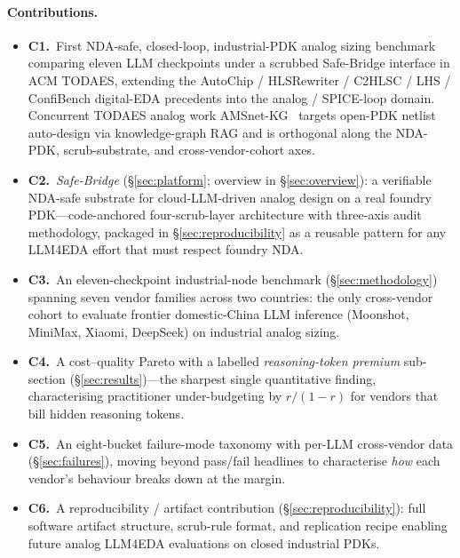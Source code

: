 \paragraph{Contributions.}
\begin{itemize}
  \item \textbf{C1.}~First NDA-safe, closed-loop, industrial-PDK
    analog sizing benchmark comparing eleven LLM checkpoints under
    a scrubbed Safe-Bridge interface in ACM TODAES, extending the
    AutoChip / HLSRewriter / C2HLSC / LHS / ConfiBench digital-EDA
    precedents into the analog / SPICE-loop domain. Concurrent
    TODAES analog work AMSnet-KG~\cite{amsnetkg} targets open-PDK
    netlist auto-design via knowledge-graph RAG and is orthogonal
    along the NDA-PDK, scrub-substrate, and cross-vendor-cohort
    axes.
  \item \textbf{C2.}~\emph{Safe-Bridge} (\S\ref{sec:platform};
    overview in \S\ref{sec:overview}): a verifiable NDA-safe
    substrate for cloud-LLM-driven analog design on a real foundry
    PDK---code-anchored four-scrub-layer architecture with
    three-axis audit methodology, packaged in
    \S\ref{sec:reproducibility} as a reusable pattern for any
    LLM4EDA effort that must respect foundry NDA.
  \item \textbf{C3.}~An eleven-checkpoint industrial-node benchmark
    (\S\ref{sec:methodology}) spanning seven vendor families across
    two countries: the only cross-vendor cohort to evaluate frontier
    domestic-China LLM inference (Moonshot, MiniMax, Xiaomi,
    DeepSeek) on industrial analog sizing.
  \item \textbf{C4.}~A cost--quality Pareto with a labelled
    \emph{reasoning-token premium} sub-section
    (\S\ref{sec:results})---the sharpest single quantitative
    finding, characterising practitioner under-budgeting by
    $r/(1{-}r)$ for vendors that bill hidden reasoning tokens.
  \item \textbf{C5.}~An eight-bucket failure-mode taxonomy with
    per-LLM cross-vendor data (\S\ref{sec:failures}), moving
    beyond pass/fail headlines to characterise \emph{how} each
    vendor's behaviour breaks down at the margin.
  \item \textbf{C6.}~A reproducibility / artifact contribution
    (\S\ref{sec:reproducibility}): full software artifact
    structure, scrub-rule format, and replication recipe enabling
    future analog LLM4EDA evaluations on closed industrial PDKs.
\end{itemize}


